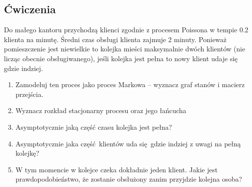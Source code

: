 \subsection{Ćwiczenia}
\begin{exercise}
	Do małego kantoru przychodzą klienci zgodnie z procesem Poissona w tempie 0.2 klienta na minutę.
	Średni czas obsługi klienta zajmuje 2 minuty.
	Ponieważ pomieszczenie jest niewielkie to kolejka mieści maksymalnie dwóch klientów (nie licząc obecnie obsługiwanego), jeśli kolejka jest pełna to
	nowy klient udaje się gdzie indziej.

	\begin{enumerate}
		\item Zamodeluj ten proces jako proces Markowa -- wyznacz graf stanów i macierz przejścia.
		\item Wyznacz rozkład stacjonarny procesu oraz jego łańcucha
		\item Asymptotycznie jaką część czasu kolejka jest pełna?
		\item Asymptotycznie jaka część klientów uda się gdzie indziej z uwagi na pełną kolejkę?
		\item W tym momencie w kolejce czeka dokładnie jeden klient. Jakie jest prawdopodobieństwo, że zostanie obsłużony zanim przyjdzie kolejna osoba?
	\end{enumerate}
\end{exercise}
